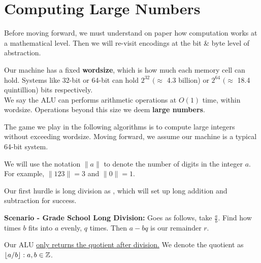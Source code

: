 \section{Computing Large Numbers}
\noindent
Before moving forward, we must understand on paper how computation works at a mathematical level. Then 
we will re-visit encodings at the bit \& byte level of abstraction.

\begin{Def}[Wordsize]

    Our machine has a fixed \textbf{wordsize}, which is how much each memory cell can hold. Systems like 32-bit or 64-bit can hold $2^{32}$ $(\approx$ 4.3 billion) or $2^{64}$ $(\approx$ 18.4 quintillion) bits respectively.\\

    \noindent
    We say the ALU can performs arithmetic operations at $O(1)$ time, within wordsize. Operations beyond this size we deem \textbf{large numbers}.
\end{Def}
\noindent
The game we play in the following algorithms is to compute large integers without exceeding wordsize. Moving forward, we assume our machine is a typical 64-bit system.
\begin{Func}

    We will use the notation $\|a\|$ to denote the number of digits in the integer $a$. For example, $\|123\| = 3$ and $\|0\| = 1$.
\end{Func}

\noindent
\noindent
Our first hurdle is long division as , which will set up long addition and subtraction for success.

\noindent
\textbf{Scenario - Grade School Long Division:} Goes as follows, take $\frac{a}{b}$. Find how times $b$ fits into $a$ evenly, $q$ times. Then $a-bq$ is our remainder $r$.
\begin{Def}

    Our ALU  \underline{only returns the quotient after division.} We denote the quotient as $\floor*{a/b}:a,b\in\Z$.
\end{Def}

